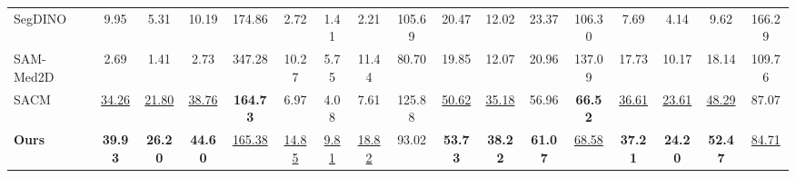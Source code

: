 \begin{table}[t]
\begin{tabular*}{\textwidth}{@{\extracolsep{\fill}}lcccccccccccccccc@{}}
SegDINO~\cite{yang2025segdino} & 9.95 & 5.31 & 10.19 & 174.86 & 2.72 & 1.41 & 2.21 & 105.69 & 20.47 & 12.02 & 23.37 & 106.30 & 7.69 & 4.14 & 9.62 & 166.29 \\
SAM-Med2D~\cite{cheng2023sammed2d} & 2.69 & 1.41 & 2.73 & 347.28 & 10.27 & 5.75 & 11.44 & 80.70 & 19.85 & 12.07 & 20.96 & 137.09 & 17.73 & 10.17 & 18.14 & 109.76 \\
SACM~\cite{zhu2026sacm} & \underline{34.26} & \underline{21.80} & \underline{38.76} & \textcolor{red!80!black}{\textbf{164.73}} & 6.97 & 4.08 & 7.61 & 125.88 & \underline{50.62} & \underline{35.18} & 56.96 & \textcolor{red!80!black}{\textbf{66.52}} & \underline{36.61} & \underline{23.61} & \underline{48.29} & 87.07 \\
\midrule
\textbf{Ours} & \textcolor{red!80!black}{\textbf{39.93}} & \textcolor{red!80!black}{\textbf{26.20}} & \textcolor{red!80!black}{\textbf{44.60}} & \underline{165.38} & \underline{14.85} & \underline{9.81} & \underline{18.82} & 93.02 & \textcolor{red!80!black}{\textbf{53.73}} & \textcolor{red!80!black}{\textbf{38.22}} & \textcolor{red!80!black}{\textbf{61.07}} & \underline{68.58} & \textcolor{red!80!black}{\textbf{37.21}} & \textcolor{red!80!black}{\textbf{24.20}} & \textcolor{red!80!black}{\textbf{52.47}} & \underline{84.71} \\
\bottomrule
\end{tabular*}
\end{table}
